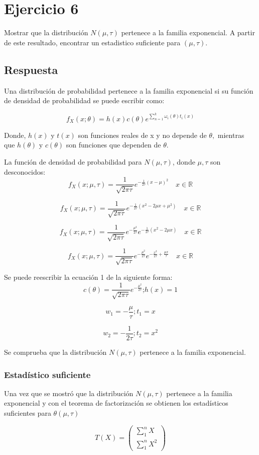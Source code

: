 \documentclass[11pt]{article}
\begin{document}
\section*{Ejercicio 6}
Mostrar que la distribución \(N(\mu, \tau)\) pertenece a la familia exponencial. A partir de este resultado,
encontrar un estadistico suficiente para \((\mu, \tau)\).
\subsection*{Respuesta}
Una distribución de probabilidad pertenece a la familia exponencial si su función de densidad de probabilidad se puede escribir como:

\begin{equation}
f_{X}(x ; \theta)=h(x) c(\theta) e^{\sum_{n=1}^{k} \omega_{i}(\theta) t_{i}(x)} 
\end{equation}

Donde, \(h(x) \text{ y }  t(x)\) son funciones reales de x y no depende de \(\theta,\) mientras que \(h(\theta) \text{ y } c(\theta)\) son funciones que dependen de \(\theta\).

La función de densidad de probabilidad para \(N(\mu, \tau)\), donde \(\mu, \tau\) son desconocidos:
$$
f_{X}(x; \mu ,\tau)=\frac{1}{\sqrt{2 \pi \tau}} e^{-\frac{1}{2 \tau}(x-\mu)^{2}} \quad x \in \mathbb{R}
$$

$$
f_{X}(x; \mu ,\tau)=\frac{1}{\sqrt{2 \pi \tau}} e^{-\frac{1}{2 \tau}(x^2-2\mu x +\mu^2)} \quad x \in \mathbb{R}
$$

$$
f_{X}(x; \mu ,\tau)=\frac{1}{\sqrt{2 \pi \tau}} e^{-\frac{\mu^2}{2 \tau}} e^{-\frac{1}{2 \tau}(x^2-2\mu x )} \quad x \in \mathbb{R}
$$

$$
f_{X}(x; \mu ,\tau)=\frac{1}{\sqrt{2 \pi \tau}} e^{-\frac{\mu^2}{2 \tau}} e^{-\frac{x^2}{2 \tau}+\frac{\mu x}{{\tau}} } \quad x \in \mathbb{R}
$$

Se puede reescribir la ecuación 1 de la siguiente forma:
$$c(\theta)=\frac{1}{\sqrt{2 \pi \tau}} e^{-\frac{\mu^2}{2 \tau}} \text{;} h(x) = 1$$

$$w_{1} = -\frac{\mu}{\tau} ;  t_{1}= x$$

$$ w_{2} = -\frac{1}{2 \tau} ;  t_{2}= x^2$$

Se comprueba que la distribución \(N(\mu, \tau)\) pertenece a la familia exponencial.
\subsubsection*{Estadístico suficiente}

Una vez que se mostró que la distribución \(N(\mu, \tau)\) pertenece a la familia exponencial y con el teorema de factorización se obtienen los estadísticos suficientes para \(\theta (\mu, \tau)\) 

$$
T(X)= \begin{pmatrix} \sum_{1}^n X \\\sum_{1}^n X^2 \end{pmatrix}
$$
\end{document}
